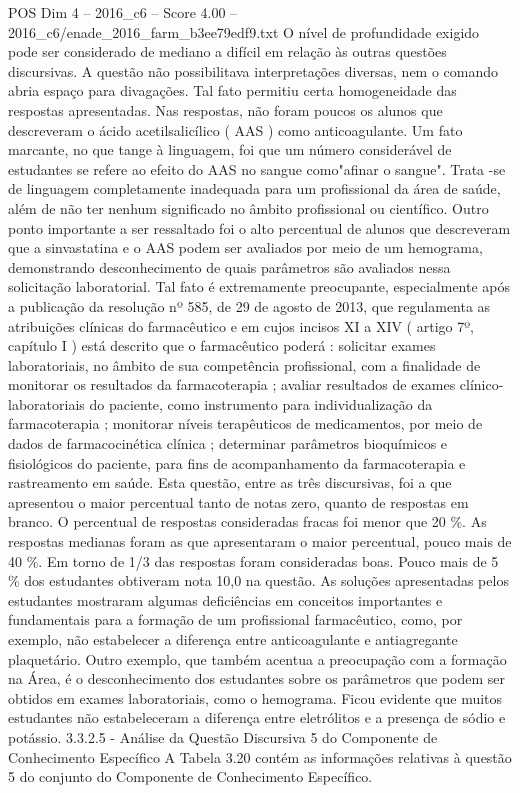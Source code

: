 \begin{textsample}{POS Dim 4 – 2016\_c6 – Score 4.00 – 2016\_c6/enade\_2016\_farm\_b3ee79edf9.txt}
O nível de profundidade exigido pode ser considerado de mediano a difícil em relação às outras questões discursivas.
A questão não possibilitava interpretações diversas, nem o comando abria espaço para divagações.
Tal fato permitiu certa homogeneidade das respostas apresentadas.
Nas respostas, não foram poucos os alunos que descreveram o ácido acetilsalicílico ( AAS ) como anticoagulante.
Um fato marcante, no que tange à linguagem, foi que um número considerável de estudantes se refere ao efeito do AAS no sangue como"afinar o sangue".
Trata -se de linguagem completamente inadequada para um profissional da área de saúde, além de não ter nenhum significado no âmbito profissional ou científico.
Outro ponto importante a ser ressaltado foi o alto percentual de alunos que descreveram que a sinvastatina e o AAS podem ser avaliados por meio de um hemograma, demonstrando desconhecimento de quais parâmetros são avaliados nessa solicitação laboratorial.
Tal fato é extremamente preocupante, especialmente após a publicação da resolução nº 585, de 29 de agosto de 2013, que regulamenta as atribuições clínicas do farmacêutico e em cujos incisos XI a XIV ( artigo 7º, capítulo I ) está descrito que o farmacêutico poderá : solicitar exames laboratoriais, no âmbito de sua competência profissional, com a finalidade de monitorar os resultados da farmacoterapia ; avaliar resultados de exames clínico-laboratoriais do paciente, como instrumento para individualização da farmacoterapia ; monitorar níveis terapêuticos de medicamentos, por meio de dados de farmacocinética clínica ; determinar parâmetros bioquímicos e fisiológicos do paciente, para fins de acompanhamento da farmacoterapia e rastreamento em saúde.
Esta questão, entre as três discursivas, foi a que apresentou o maior percentual tanto de notas zero, quanto de respostas em branco.
O percentual de respostas consideradas fracas foi menor que 20 \%.
As respostas medianas foram as que apresentaram o maior percentual, pouco mais de 40 \%.
Em torno de 1/3 das respostas foram consideradas boas.
Pouco mais de 5 \% dos estudantes obtiveram nota 10,0 na questão.
As soluções apresentadas pelos estudantes mostraram algumas deficiências em conceitos importantes e fundamentais para a formação de um profissional farmacêutico, como, por exemplo, não estabelecer a diferença entre anticoagulante e antiagregante plaquetário.
Outro exemplo, que também acentua a preocupação com a formação na Área, é o desconhecimento dos estudantes sobre os parâmetros que podem ser obtidos em exames laboratoriais, como o hemograma.
Ficou evidente que muitos estudantes não estabeleceram a diferença entre eletrólitos e a presença de sódio e potássio. 3.3.2.5 - Análise da Questão Discursiva 5 do Componente de Conhecimento Específico A Tabela 3.20 contém as informações relativas à questão 5 do conjunto do Componente de Conhecimento Específico.

\end{textsample}
